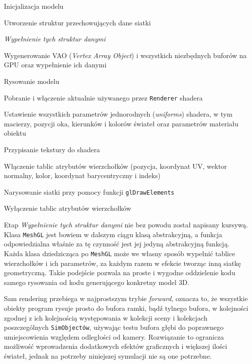 		\begin{algorithm}
			\label{alg_4_4}
			\caption{Inicjalizacja modelu}	
			
			Utworzenie struktur przechowujących dane siatki
			
			\emph{Wypełnienie tych struktur danymi}
			
			Wygenerowanie VAO (\emph{Vertex Array Object}) i wszystkich niezbędnych buforów na GPU oraz wypełnienie ich danymi
		\end{algorithm}
		
		\begin{algorithm}
			\label{alg_4_5}
			\caption{Rysowanie modelu}	
			
			Pobranie i włączenie aktualnie używanego przez \texttt{Renderer} shadera
			
			Ustawienie wszystkich parametrów jednorodnych (\emph{uniforms}) shadera, w tym macierzy, pozycji oka, kierunków i kolorów świateł oraz parametrów materiału obiektu
			
			Przypisanie tekstury do shadera
			
			Włączenie tablic atrybutów wierzchołków (pozycja, koordynat UV, wektor normalny, kolor, koordynat barycentryczny i indeks)
			
			Narysowanie siatki przy pomocy funkcji \texttt{glDrawElements}
			
			Wyłączenie tablic atrybutów wierzchołków
		\end{algorithm}
		
		Etap \emph{Wypełnienie tych struktur danymi} nie bez powodu został napisany kursywą. Klasa \texttt{MeshGL} jest bowiem w dalszym ciągu klasą abstrakcyjną, a funkcja odpowiedzialna właśnie za tę czynność jest jej jedyną abstrakcyjną funkcją. Każda klasa dziedzicząca po \texttt{MeshGL} może we własny sposób wypełnić tablice wierzchołków i ich parametrów, za każdym razem w efekcie tworząc inną siatkę geometryczną. Takie podejście pozwala na proste i wygodne oddzielenie kodu samego rysowania od kodu generującego konkretny model 3D.
		
		Sam rendering przebiega w najprostszym trybie \emph{forward}, oznacza to, że wszystkie obiekty program rysuje prosto do bufora ramki, bądź tylnego bufora, w kolejności zgodnej z ich kolejnością występowania w kolekcji sceny i kolekcjach poszczególnych \texttt{SimObjectów}, używając testu bufora głębi do poprawnego umiejscowienia względem odległości od kamery. Rozwiązanie to ogranicza możliwość wprowadzenia dodatkowych efektów graficznych i większej ilości świateł, jednak na potrzeby niniejszej symulacji nie są one potrzebne.
		
